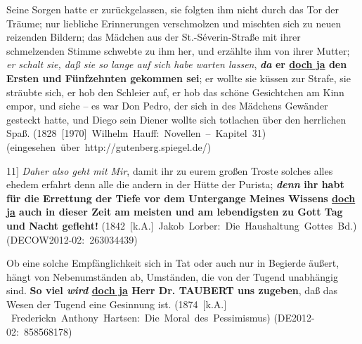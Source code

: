 \begin{exe}
	\ex\label{517} 
	\scriptsize
	Seine Sorgen hatte er zurückgelassen, sie folgten ihm nicht durch das Tor der Träume; nur liebliche Erinnerungen verschmolzen und mischten sich zu 			neuen reizenden Bildern; das Mädchen aus der St.-Séverin-Straße mit ihrer schmelzenden Stimme schwebte zu ihm her, und erzählte ihm von ihrer Mutter; 		\emph{er schalt sie, daß sie so lange auf sich habe warten lassen}, \textbf{\textit{da} er \underline{doch ja} den Ersten und Fünf\-zehnten gekommen sei}; er wollte sie küssen zur Strafe, sie sträubte sich, er hob den Schleier auf, er hob das schöne Gesichtchen am Kinn empor, und siehe – 		es war Don Pedro, der sich in des Mädchens Gewänder gesteckt hatte, und Diego sein Diener wollte sich totlachen über den herrlichen Spaß. 
	\newline
	\hbox{}\hfill\hbox{(1828 $[$1970$]$ Wilhelm Hauff: Novellen – Kapitel 31)}
	\newline
	\hbox{}\hfill\hbox{(eingesehen über http://gutenberg.spiegel.de/)}
\end{exe}	
						    	        
\begin{exe}
	\ex\label{518} 
	\scriptsize
	11$]$ \emph{Daher also geht mit Mir}, damit ihr zu eurem großen Troste solches alles ehedem erfahrt denn alle die andern in der Hütte der 			Purista; \textbf{\textit{denn} ihr habt für die Errettung der Tiefe vor dem Untergange Meines Wissens \underline{doch ja} auch in dieser Zeit am 			meisten und am lebendigsten zu Gott Tag und Nacht gefleht!}	
	\hfill\hbox{(1842 $[$k.A.$]$ Jakob Lorber: Die Haushaltung Gottes Bd.)}
	\newline
	\hbox{}\hfill\hbox{(DECOW2012-02: 263034439)}
\end{exe}								                        
											  
\begin{exe}
	\ex\label{519} 
	\scriptsize
	Ob eine solche Empfänglichkeit sich in Tat oder auch nur in Begierde äußert, hängt von Nebenumständen ab, Umständen, die von der Tugend unabhängig 			sind. \textbf{So viel \textit{wird} \underline{doch ja} Herr Dr. TAUBERT uns zugeben}, daß das Wesen der Tugend eine Gesinnung ist.	
	\newline
	\hbox{}\hfill\hbox{(1874 $[$k.A.$]$ Frederickn Anthony Hartsen: Die Moral des Pessimismus)}
	\newline
	\hbox{}\hfill\hbox{(DE2012-02: 858568178)}
\end{exe}						                        
		      
